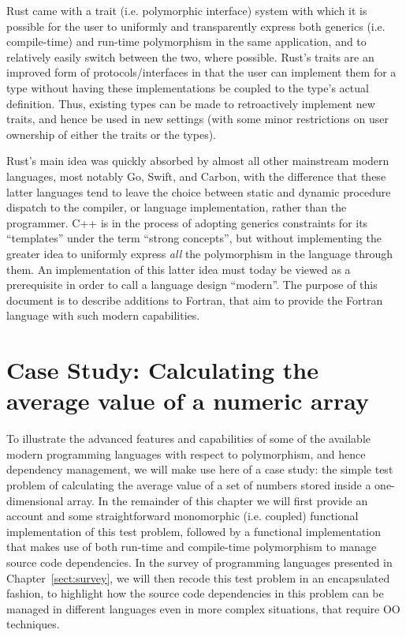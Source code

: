 \documentclass[11pt,oneside]{report}
\begin{document}
Rust came with a trait (i.e. polymorphic interface) system with which
it is possible for the user to uniformly and transparently express
both generics (i.e. compile-time) and run-time polymorphism in the
same application, and to relatively easily switch between the two,
where possible. Rust's traits are an improved form of
protocols/interfaces in that the user can implement them for a type
without having these implementations be coupled to the type's actual
definition. Thus, existing types can be made to retroactively
implement new traits, and hence be used in new settings (with some
minor restrictions on user ownership of either the traits or the
types).

Rust's main idea was quickly absorbed by almost all other mainstream
modern languages, most notably Go, Swift, and Carbon, with the
difference that these latter languages tend to leave the choice
between static and dynamic procedure dispatch to the compiler, or
language implementation, rather than the programmer. C++ is in the
process of adopting generics constraints for its ``templates'' under
the term ``strong concepts'', but without implementing the greater
idea to uniformly express \emph{all} the polymorphism in the language
through them. An implementation of this latter idea must today be
viewed as a prerequisite in order to call a language design
``modern''. The purpose of this document is to describe additions to
Fortran, that aim to provide the Fortran language with such modern
capabilities.

\chapter{Case Study: Calculating the average value of a numeric array}

To illustrate the advanced features and capabilities of some of the
available modern programming languages with respect to polymorphism,
and hence dependency management, we will make use here of a case
study: the simple test problem of calculating the average value of a set
of numbers stored inside a one-dimensional array. In the remainder of
this chapter we will first provide an account and some straightforward
monomorphic (i.e. coupled) functional implementation of this test
problem, followed by a functional implementation that makes use of
both run-time and compile-time polymorphism to manage source code
dependencies. In the survey of programming languages presented in
Chapter~\ref{sect:survey}, we will then recode this test problem in an
encapsulated fashion, to highlight how the source code dependencies in
this problem can be managed in different languages even in more
complex situations, that require OO techniques.
\end{document}
